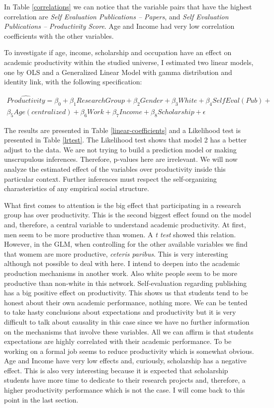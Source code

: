 \documentclass[a4paper, 12pt, openright, oneside, article, german, french, brazil, english]{abntex2}
\begin{document}
In Table \ref{correlations} we can notice that the variable pairs that have the highest correlation are \textit{Self Evaluation Publications -- Papers}, and \textit{Self Evaluation Publications -- Productivity Score}. Age and Income had very low correlation coefficients with the other variables.

To investigate if age, income, scholarship and occupation have an effect on academic productivity within the studied universe, I estimated two linear models, one by OLS and a Generalized Linear Model with gamma distribution and identity link, with the following specification:

\begin{multline}
\label{linear}
\widehat{Productivity} = \beta_0 + \beta_1ResearchGroup + \beta_2Gender + \beta_3White + \beta_4Self Eval(Pub) + \\ \beta_5Age(centralized) + \beta_6Work + \beta_7Income + \beta_8Scholarship + \epsilon
\end{multline}

The results are presented in Table \ref{linear-coefficients} and a Likelihood test is presented in Table \ref{lrtest}. The Likelihood test shows that model 2 has a better adjust to the data. We are not trying to build a prediction model or making unscrupulous inferences. Therefore, p-values here are irrelevant. We will now analyze the estimated effect of the variables over productivity inside this particular context. Further inferences must respect the self-organizing charasteristics of any empirical social structure. 

What first comes to attention is the big effect that participating in a research group has over productivity.  This is the second biggest effect found on the model and, therefore, a central variable to understand academic productivity. At first, men seem to be more productive than women. A \textit{t test} showed this relation. However, in the GLM, when controlling for the other available variables we find that womem are more productive, \textit{ceteris paribus}. This is very interesting although not possible to deal with here. I intend to deepen into the academic production mechanisms in another work. Also white people seem to be more productive than non-white in this network. Self-evaluation regarding publishing has a big positive effect on productivity. This shows us that students tend to be honest about their own academic performance, nothing more. We can be tented to take hasty conclusions about expectations and productivity but it is very difficult to talk about causality in this case since we have no further information on the mechanisms that involve these variables. All we can affirm is that students expectations are highly correlated with their academic performance. To be working on a formal job seems to reduce productivity which is somewhat obvious. Age and Income have very low effects and, curiously, scholarship has a negative effect. This is also very interesting because it is expected that scholarship students have more time to dedicate to their research projects and, therefore, a higher productivity performance which is not the case. I will come back to this point in the last section.
\end{document}
